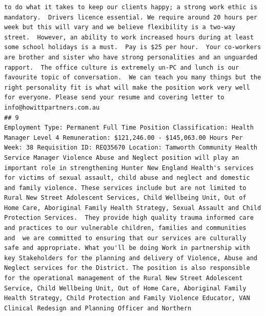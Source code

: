 \documentclass[11pt,a4paper,]{article}
\begin{document}
\begin{verbatim}
to do what it takes to keep our clients happy; a strong work ethic is mandatory.  Drivers licence essential. We require around 20 hours per week but this will vary and we believe flexibility is a two-way street.  However, an ability to work increased hours during at least some school holidays is a must.  Pay is $25 per hour.  Your co-workers are brother and sister who have strong personalities and an unguarded rapport.  The office culture is extremely un-PC and lunch is our favourite topic of conversation.  We can teach you many things but the right personality fit is what will make the position work very well for everyone. Please send your resume and covering letter to info@howittpartners.com.au
## 9                                                                                                                                                                                                                                                                                                                                                                                                                                                                                                                                                                                                                                                                                                                                                                                                                                                                                                                                                                                                                                                                                                                                                                                                                                                                                                                                                                                       Employment Type: Permanent Full Time Position Classification: Health Manager Level 4 Remuneration: $121,246.00 - $145,063.00 Hours Per Week: 38 Requisition ID: REQ35670 Location: Tamworth Community Health Service Manager Violence Abuse and Neglect position will play an important role in strengthening Hunter New England Health's services for victims of sexual assault, child abuse and neglect and domestic and family violence. These services include but are not limited to Rural New Street Adolescent Services, Child Wellbeing Unit, Out of Home Care, Aboriginal Family Health Strategy, Sexual Assault and Child Protection Services.  They provide high quality trauma informed care and practices to our vulnerable children, families and communities and  we are committed to ensuring that our services are culturally safe and appropriate. What you'll be doing Work in partnership with key Stakeholders for the planning and delivery of Violence, Abuse and Neglect services for the District. The position is also responsible for the operational management of the Rural New Street Adolescent Service, Child Wellbeing Unit, Out of Home Care, Aboriginal Family Health Strategy, Child Protection and Family Violence Educator, VAN Clinical Redesign and Planning Officer and Northern 
\end{verbatim}
\end{document}
